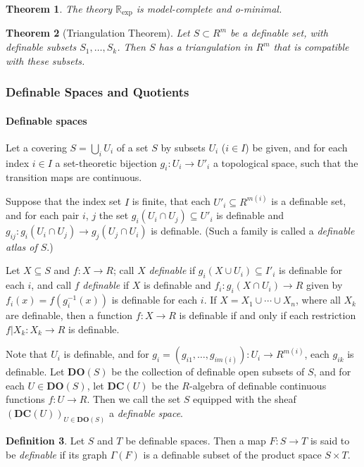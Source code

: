 \documentclass{amsart}
\newtheorem{theorem}{Theorem}[section]
\theoremstyle{definition}
\newtheorem{definition}[theorem]{Definition}
\numberwithin{equation}{section}
\begin{document}
\begin{theorem}
    The theory $\mathbb{R}_{\exp}$ is model-complete and o-minimal.
\end{theorem}

\begin{theorem}[Triangulation Theorem]
    Let $S \subset R^m$ be a definable set,
    with definable subsets $S_1,\dots,S_k$.
    Then $S$ has a triangulation in $R^m$ that is compatible with these subsets.
\end{theorem}

\subsubsection{Definable Spaces and Quotients}
\paragraph{\bfseries Definable spaces}
Let a covering $S = \bigcup_i U_i$ of a set $S$ by subsets $U_i$ ($i\in I$) be given,
and for each index $i \in I$ a set-theoretic bijection $g_i: U_i \to U'_i$ a topological space,
such that the transition maps are continuous.

Suppose that the index set $I$ is finite,
that each $U'_i \subseteq R^{m(i)}$ is a definable set,
and for each pair $i$, $j$ the set $g_i(U_i\cap U_j) \subseteq U'_i$
is definable and $g_{ij}: g_i(U_i\cap U_j) \to g_j(U_j\cap U_i)$ is definable.
(Such a family is called a \emph{definable atlas of $S$}.)

Let $X \subseteq S$ and $f : X \to R$;
call $X$ \emph{definable} if $g_i(X\cup U_i) \subseteq I'_i$ is definable for each $i$,
and call $f$ \emph{definable} if $X$ is definable and 
$f_i : g_i(X \cap U_i) \to R$ given by $f_i(x) = f(g_i^{-1}(x))$ is definable for each $i$.
If $X = X_1\cup \cdots \cup X_n$,
where all $X_k$ are definable,
then a function $f: X \to R$ is definable if and only if each restriction $f|X_k: X_k \to R$ is definable.

Note that $U_i$ is definable,
and for $g_i = (g_{i1},\dots,g_{im(i)}) : U_i \to R^{m(i)}$,
each $g_{ik}$ is definable.
Let $\mathbf{DO}(S)$ be the collection of definable open subsets of $S$,
and for each $U \in \mathbf{DO}(S)$,
let $\mathbf{DC}(U)$ be the $R$-algebra of definable continuous functions $f: U \to R$.
Then we call the set $S$ equipped with the sheaf $(\mathbf{DC}(U))_{U \in \mathbf{DO}(S)}$ a \emph{definable space}.

\begin{definition}
    Let $S$ and $T$ be definable spaces.
    Then a map $F: S \to T$ is said to be \emph{definable} if its graph $\Gamma(F)$ is a definable subset of the product space $S \times T$.
\end{definition}
\end{document}
